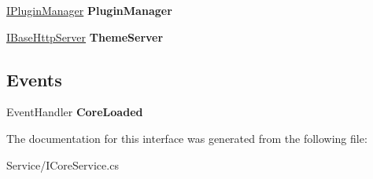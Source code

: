 \begin{DoxyCompactItemize}
\item 
\hypertarget{interface_snowflake_1_1_service_1_1_i_core_service_a0e20bc179206663cd7a48b18f5faeadb}{}\hyperlink{interface_snowflake_1_1_service_1_1_manager_1_1_i_plugin_manager}{I\+Plugin\+Manager} {\bfseries Plugin\+Manager}\label{interface_snowflake_1_1_service_1_1_i_core_service_a0e20bc179206663cd7a48b18f5faeadb}

\item 
\hypertarget{interface_snowflake_1_1_service_1_1_i_core_service_a794ee077c21b8c82a3da6b0a67a1819d}{}\hyperlink{interface_snowflake_1_1_service_1_1_http_server_1_1_i_base_http_server}{I\+Base\+Http\+Server} {\bfseries Theme\+Server}\label{interface_snowflake_1_1_service_1_1_i_core_service_a794ee077c21b8c82a3da6b0a67a1819d}

\end{DoxyCompactItemize}
\subsection*{Events}
\begin{DoxyCompactItemize}
\item 
\hypertarget{interface_snowflake_1_1_service_1_1_i_core_service_a221a3fb0da7e614a91584a1915790305}{}Event\+Handler {\bfseries Core\+Loaded}\label{interface_snowflake_1_1_service_1_1_i_core_service_a221a3fb0da7e614a91584a1915790305}

\end{DoxyCompactItemize}


The documentation for this interface was generated from the following file\+:\begin{DoxyCompactItemize}
\item 
Service/I\+Core\+Service.\+cs\end{DoxyCompactItemize}
